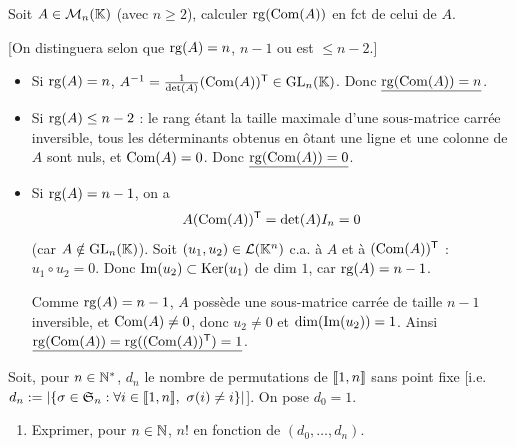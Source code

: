 
\begin{statementbox}
Soit $A\in\mathcal M_n(\mathbb K)$ (avec $n\geq2$), calculer $\operatorname{rg}(\operatorname{Com}(A))$ en fct de celui de $A$.

[On distinguera selon que $\operatorname{rg}(A)=n$, $n-1$ ou est $\leq n-2$.]
\end{statementbox}

\begin{solution}
\begin{itemize}
  \item Si $\operatorname{rg}(A)=n$, $A^{-1}=\frac1{\det(A)}(\operatorname{Com}(A))^{\mathsf T}\in\operatorname{GL}_n(\mathbb K)$.
  Donc $\underline{\operatorname{rg}(\operatorname{Com}(A))=n}$.

  \item Si $\operatorname{rg}(A)\leq n-2$ : le rang étant la taille maximale d'une sous-matrice carrée
  inversible, tous les déterminants obtenus en ôtant une ligne et une colonne de $A$ sont
  nuls, et $\operatorname{Com}(A)=0$. Donc $\underline{\operatorname{rg}(\operatorname{Com}(A))=0}$.

  \item Si $\operatorname{rg}(A)=n-1$, on a
  \[
  A(\operatorname{Com}(A))^{\mathsf T}=\det(A)I_n=0
  \]
  (car $A\notin\operatorname{GL}_n(\mathbb K)$). Soit $(u_1,u_2)\in\mathcal L(\mathbb K^n)$ c.a. à $A$ et à
  $(\operatorname{Com}(A))^{\mathsf T}$ : $u_1\circ u_2=0$. Donc
  $\operatorname{Im}(u_2)\subset\operatorname{Ker}(u_1)$ de dim $1$, car $\operatorname{rg}(A)=n-1$.

  Comme $\operatorname{rg}(A)=n-1$, $A$ possède une sous-matrice carrée de taille $n-1$ inversible, et
  $\operatorname{Com}(A)\neq0$, donc $u_2\neq0$ et $\dim(\operatorname{Im}(u_2))=1$.
  Ainsi $\underline{\operatorname{rg}(\operatorname{Com}(A))=\operatorname{rg}((\operatorname{Com}(A))^{\mathsf T})=1}$.
\end{itemize}
\end{solution}


\begin{statementbox}
Soit, pour $n\in\mathbb N^*$, $d_n$ le nombre de permutations de $\llbracket 1,n\rrbracket$ sans point
fixe [i.e.
$d_n:=|\{\sigma\in\mathfrak S_n:\forall i\in\llbracket 1,n\rrbracket,\ \sigma(i)\neq i\}|$].
On pose $d_0=1$.

\begin{enumerate}[label=\alph*)]
  \item Exprimer, pour $n\in\mathbb N$, $n!$ en fonction de $(d_0,\ldots,d_n)$.
\end{enumerate}
\end{statementbox}

